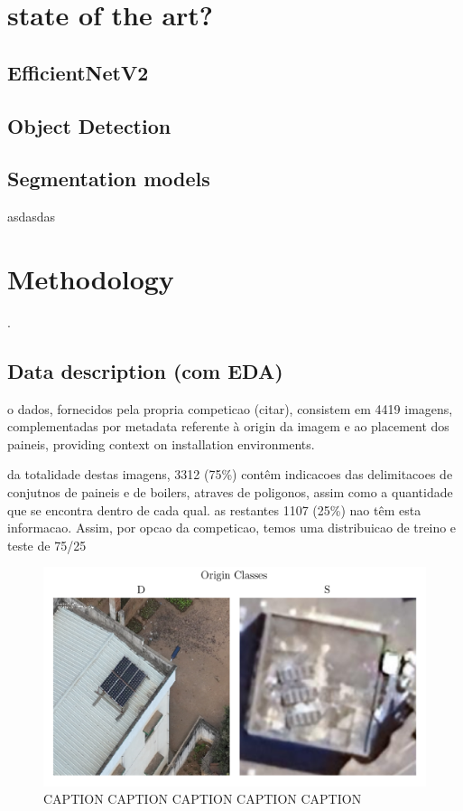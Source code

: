 \documentclass[conference]{IEEEtran}
\begin{document}

\section{state of the art?}

\subsection{EfficientNetV2}

\subsection{Object Detection}

\subsection{Segmentation models}
asdasdas

\section{Methodology}.

\subsection{Data description (com EDA)}

o dados, fornecidos pela propria competicao (citar), consistem em 4419 imagens, complementadas por metadata referente à origin da imagem e ao placement dos paineis, providing context on installation environments.

da totalidade destas imagens, 3312 (75\%) contêm indicacoes das delimitacoes de conjutnos de paineis e de boilers, atraves de poligonos, assim como a quantidade que se encontra dentro de cada qual. as restantes 1107 (25\%) nao têm esta informacao. Assim, por opcao da competicao, temos uma distribuicao de treino e teste de 75/25

\begin{figure}[H]
    \centering
    \includegraphics[width=1\linewidth]{assets/data_origin_classes.png}
    \caption{CAPTION CAPTION CAPTION CAPTION CAPTION}
    \label{fig:data_origin_classes}
\end{figure}
\end{document}
